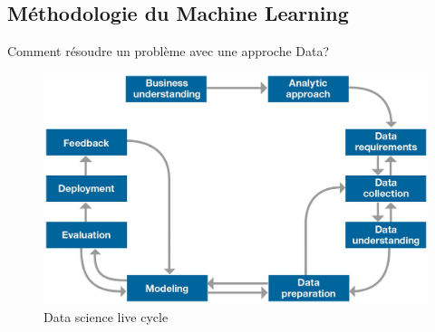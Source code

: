 \documentclass{beamer}
\begin{document}
	\subsection{Méthodologie du Machine Learning}
	\begin{frame}{Comment résoudre un problème avec une approche Data?}
	\begin{figure}
			\begin{center}
			\includegraphics[scale=0.2]{DataMethod.jpg}
		\end{center}
	\caption{Data science live cycle}
	\end{figure}
	\end{frame}


\end{document}
